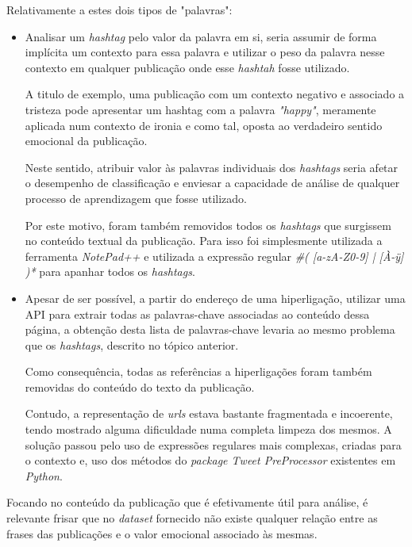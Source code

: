 Relativamente a estes dois tipos de "palavras":
\begin{itemize}
    \item Analisar um \textit{hashtag} pelo valor da palavra em si, seria assumir de forma implícita um contexto para essa palavra e utilizar o peso da palavra nesse contexto em qualquer publicação onde esse \textit{hashtah} fosse utilizado.
    
    A titulo de exemplo, uma publicação com um contexto negativo e associado a tristeza pode apresentar um hashtag com a palavra \textit{"happy"}, meramente aplicada num contexto de ironia e como tal, oposta ao verdadeiro sentido emocional da publicação.
    
    Neste sentido, atribuir valor às palavras individuais dos \textit{hashtags} seria afetar o desempenho de classificação e enviesar a capacidade de análise de qualquer processo de aprendizagem que fosse utilizado. 
    
    Por este motivo, foram também removidos todos os \textit{hashtags} que surgissem no conteúdo textual da publicação. 
    Para isso foi simplesmente utilizada a ferramenta \textit{NotePad++} e utilizada a expressão regular \textit{\#( [a-zA-Z0-9] | [À-ÿ] )*} para apanhar todos os \textit{hashtags}. 
    
    \item Apesar de ser possível, a partir do endereço de uma hiperligação, utilizar uma API para extrair todas as palavras-chave associadas ao conteúdo dessa página, a obtenção desta lista de palavras-chave levaria ao mesmo problema que os \textit{hashtags}, descrito no tópico anterior. 
    
    Como consequência, todas as referências a hiperligações foram também removidas do conteúdo do texto da publicação. 
    
    Contudo, a representação de \textit{urls} estava bastante fragmentada e incoerente, tendo mostrado alguma dificuldade numa completa limpeza dos mesmos. A solução passou pelo uso de expressões regulares mais complexas, criadas para o contexto e,  uso dos métodos do \textit{package Tweet PreProcessor} existentes em \textit{Python}. 
    
\end{itemize}

Focando no conteúdo da publicação que é efetivamente útil para análise, é relevante frisar que no \textit{dataset} fornecido não existe qualquer relação entre as frases das publicações e o valor emocional associado às mesmas. 

